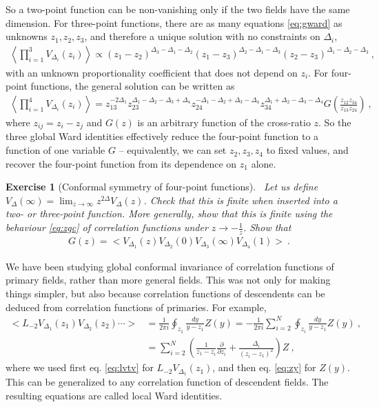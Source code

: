 \documentclass[12pt, a4paper]{article}
\theoremstyle{break}
\newtheorem{exo}{Exercise}[section]
\begin{document}
So a two-point function can be non-vanishing only if the two fields have the same dimension.
For three-point functions, there are as many equations \eqref{eq:gward} as unknowns $z_1,z_2,z_3$, and therefore a unique solution with no constraints on $\Delta_i$,
\begin{align}
 \left< \prod_{i=1}^3 V_{\Delta_i}(z_i) \right> \propto (z_1-z_2)^{\Delta_3-\Delta_1-\Delta_2} (z_1-z_3)^{\Delta_2-\Delta_1-\Delta_3} (z_2-z_3)^{\Delta_1-\Delta_2-\Delta_3}\ ,
 \label{eq:3pt}
\end{align}
with an unknown proportionality coefficient that does not depend on $z_i$.
For four-point functions, the general solution can be written as 
\begin{align}
 \left< \prod_{i=1}^4 V_{\Delta_i}(z_i) \right> 
 = z_{13}^{-2\Delta_1} z_{23}^{\Delta_1-\Delta_2-\Delta_3+\Delta_4} z_{24}^{-\Delta_1-\Delta_2+\Delta_3-\Delta_4} z_{34}^{\Delta_1+\Delta_2-\Delta_3-\Delta_4} G\left(\frac{z_{12}z_{34}}{z_{13}z_{24}}\right)\ ,
 \label{eq:4pt}
\end{align}
where $z_{ij} = z_i - z_j$ and $G(z)$ is an arbitrary function of the cross-ratio $z$. 
So the three global Ward identities effectively reduce the four-point function to a function of one variable $G$ -- equivalently, we can set $z_2,z_3,z_4$ to fixed values, and recover the four-point function from its dependence on $z_1$ alone. 

\begin{exo}[Conformal symmetry of four-point functions]
~\label{exo:4pt}
 Let us define $V_\Delta(\infty) = \lim_{z\to\infty} z^{2\Delta}V_\Delta(z) $. Check that this is finite when inserted into a two- or three-point function. More generally, show that this is finite using the behaviour \eqref{eq:zgc} of correlation functions under $z\to -\frac{1}{z}$. 
 Show that
 \begin{align}
  G(z) = \Big< V_{\Delta_1}(z) V_{\Delta_2}(0)V_{\Delta_3}(\infty)V_{\Delta_4}(1) \Big>\ .
 \end{align}
\end{exo}

We have been studying global conformal invariance of correlation functions of primary fields, rather than more general fields. This was not only for making things simpler, but also because correlation functions of descendents can be deduced from correlation functions of primaries. For example,
\begin{align}
 \Big< L_{-2}V_{\Delta_1}(z_1) V_{\Delta_2}(z_2)\cdots \Big>
  &= \frac{1}{2\pi i}\oint_{z_1} \frac{dy}{y-z_1} Z(y)
  = -\frac{1}{2\pi i} \sum_{i=2}^N \oint_{z_i} \frac{dy}{y-z_1} Z(y)\ ,
  \\
  &  =\sum_{i=2}^N\left(\frac{1}{z_1-z_i}\frac{\partial}{\partial z_i} +\frac{\Delta_i}{(z_i-z_1)^2}\right) Z\ ,
  \label{eq:ltv}
\end{align}
where we used first eq. \eqref{eq:lvtv} for $L_{-2}V_{\Delta_1}(z_1)$, and then eq. \eqref{eq:zy} for $Z(y)$.
This can be generalized to any correlation function of descendent fields. The resulting equations are called local Ward identities.
\end{document}
